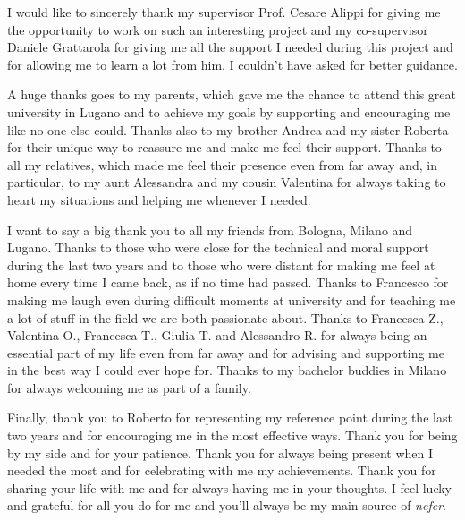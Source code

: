
\begin{acknowledgements}
I would like to sincerely thank my supervisor Prof. Cesare Alippi for giving me the opportunity to work on such an interesting project and my co-supervisor Daniele Grattarola for giving me all the support I needed during this project and for allowing me to learn a lot from him. I couldn't have asked for better guidance.

A huge thanks goes to my parents, which gave me the chance to attend this great university in Lugano and to achieve my goals by supporting and encouraging me like no one else could. Thanks also to my brother Andrea and my sister Roberta for their unique way to reassure me and make me feel their support. Thanks to all my relatives, which made me feel their presence even from far away and, in particular, to my aunt Alessandra and my cousin Valentina for always taking to heart my situations and helping me whenever I needed.

I want to say a big thank you to all my friends from Bologna, Milano and Lugano. Thanks to those who were close for the technical and moral support during the last two years and to those who were distant for making me feel at home every time I came back, as if no time had passed. Thanks to Francesco for making me laugh even during difficult moments at university and for teaching me a lot of stuff in the field we are both passionate about. Thanks to Francesca Z., Valentina O., Francesca T., Giulia T. and Alessandro R. for always being an essential part of my life even from far away and for advising and supporting me in the best way I could ever hope for. Thanks to my bachelor buddies in Milano for always welcoming me as part of a family.

Finally, thank you to Roberto for representing my reference point during the last two years and for encouraging me in the most effective ways. Thank you for being by my side and for your patience. Thank you for always being present when I needed the most and for celebrating with me my achievements. Thank you for sharing your life with me and for always having me in your thoughts. I feel lucky and grateful for all you do for me and you'll always be my main source of \textit{nefer}.
\end{acknowledgements}